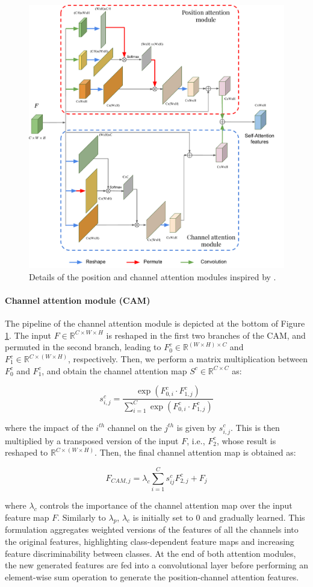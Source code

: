 \documentclass[journal]{IEEEtran}
\begin{document}
\begin{figure}[h!]
    \centering
    \includegraphics[width=.475\textwidth]{Dual.pdf}
    \caption{Details of the position and channel attention modules inspired by \cite{fu2018dual}.}
    \label{fig:dual}
\end{figure}



\paragraph*{\textbf{Channel attention module (CAM)}}
The pipeline of the channel attention module is depicted at the bottom of Figure \ref{fig:dual}. The input $F \in \mathbb{R}^{C\times W\times H}$ is reshaped in the first two branches of the CAM, and permuted in the second branch, leading to $F_{0}^c \in \mathbb{R}^{(W\times H)\times C}$ and 
$F_{1}^c \in \mathbb{R}^{C \times (W\times H)}$, respectively. Then, we perform a matrix multiplication between $F_{0}^c$ and $F_{1}^c$, and obtain the channel attention map $S^c \in \mathbb{R}^{C \times C}$ as: 

\begin{equation}
    s_{i,j}^c = \frac{\exp{(F_{0,i}^c \cdot F_{1,j}^c)}}{\sum_{i=1}^{C}\exp{(F_{0,i}^c \cdot F_{1,j}^c)}}
\end{equation}

where the impact of the $i^{th}$ channel on the $j^{th}$ is given by $s_{i,j}^c$. This is then multiplied by a transposed version of the input $F$, i.e., $F_2^c$, whose result is reshaped to $\mathbb{R}^{C \times (W\times H)}$. Then, the final channel attention map is obtained as:

\begin{equation}
    F_{CAM,j} = \lambda_c\sum_{i=1}^{C}s_{ij}^cF_{2,j}^c + F_j
\end{equation}

where $\lambda_c$ controls the importance of the channel attention map over the input feature map $F$. Similarly to $\lambda_p$, $\lambda_c$ is initially set to 0 and gradually learned. This formulation aggregates weighted versions of the features of all the channels into the original features, highlighting class-dependent feature maps and increasing feature discriminability between classes. At the end of both attention modules, the new generated features are fed into a convolutional layer before performing an element-wise sum operation to generate the position-channel attention features.
\end{document}
